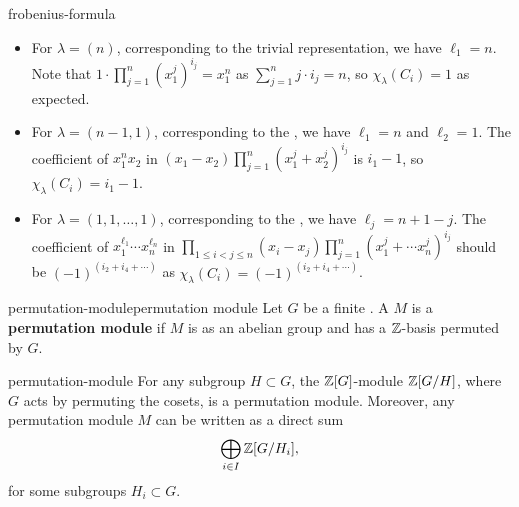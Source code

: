 \begin{example}{frobenius-formula}
    \begin{itemize}
        \item For $\lambda = (n)$, corresponding to the trivial representation, we have $\ell_1 = n$. Note that $1 \cdot \prod_{j = 1}^{n} (x_1^j)^{i_j} = x_1^n$ as $\sum_{j = 1}^{n} j \cdot i_j = n$, so $\chi_\lambda(C_i) = 1$ as expected.
        \item For $\lambda = (n - 1, 1)$, corresponding to the , we have $\ell_1 = n$ and $\ell_2 = 1$. The coefficient of $x_1^n x_2$ in $(x_1 - x_2) \prod_{j = 1}^{n} (x_1^j + x_2^j)^{i_j}$ is $i_1 - 1$, so $\chi_\lambda(C_i) = i_1 - 1$. %
        \item For $\lambda = (1, 1, \ldots, 1)$, corresponding to the , we have $\ell_j = n + 1 - j$. The coefficient of $x_1^{\ell_1} \cdots x_n^{\ell_n}$ in $\prod_{1 \le i < j \le n} (x_i - x_j) \prod_{j = 1}^{n} (x_1^j + \cdots x_n^j)^{i_j}$ should be $(-1)^{(i_2 + i_4 + \cdots)}$ as $\chi_\lambda(C_i) = (-1)^{(i_2 + i_4 + \cdots)}$.
    \end{itemize}
\end{example}

\begin{topic}{permutation-module}{permutation module}
    Let $G$ be a finite . A  $M$ is a \textbf{permutation module} if $M$ is  as an abelian group and has a $\mathbb{Z}$-basis permuted by $G$.
\end{topic}

\begin{example}{permutation-module}
    For any subgroup $H \subset G$, the $\mathbb{Z}[G]$-module $\mathbb{Z}[G/H]$, where $G$ acts by permuting the cosets, is a permutation module. Moreover, any permutation module $M$ can be written as a direct sum
    \[ \bigoplus_{i \in I} \mathbb{Z}[G/H_i] , \]
    for some subgroups $H_i \subset G$.
\end{example}

